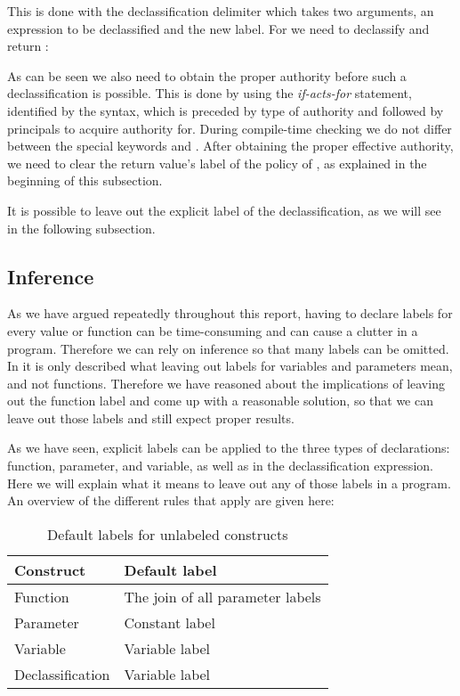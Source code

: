 This is done with the declassification delimiter \dlmc{<| |>} which takes two arguments, an expression to be declassified and the new label.
For  we need to declassify and return :\\
\begin{minipage}{\linewidth}

\end{minipage}

As can be seen we also need to obtain the proper authority before such a declassification is possible.
This is done by using the \emph{if-acts-for} statement, identified by the  syntax, which is preceded by type of authority and followed by principals to acquire authority for.
During compile-time checking we do not differ between the special keywords  and .
After obtaining the proper effective authority, we need to clear the return value's label of the policy of , as explained in the beginning of this subsection.

It is possible to leave out the explicit label of the declassification, as we will see in the following subsection.

\subsection{Inference}
As we have argued repeatedly throughout this report, having to declare labels for every value or function can be time-consuming and can cause a clutter in a program.
Therefore we can rely on inference so that many labels can be omitted.
In \cite{myers1997} it is only described what leaving out labels for variables and parameters mean, and not functions.
Therefore we have reasoned about the implications of leaving out the function label and come up with a reasonable solution, so that we can leave out those labels and still expect proper results.

As we have seen, explicit labels can be applied to the three types of declarations: function, parameter, and variable, as well as in the declassification expression.
Here we will explain what it means to leave out any of those labels in a program.
An overview of the different rules that apply are given here:
\begin{table}[H]
  \begin{tabularx}{\textwidth}{|l|X|}
    \hline
    \textbf{Construct} & \textbf{Default label} \\ \hline \hline
    Function & The join of all parameter labels \\ \hline
    Parameter & Constant label \\ \hline
    Variable & Variable label \\ \hline
    Declassification & Variable label \\ \hline
  \end{tabularx}
  \caption{Default labels for unlabeled constructs}
  \label{informal:table:default_labels}
\end{table}

